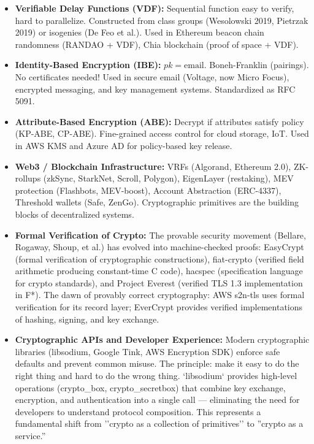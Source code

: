 \begin{itemize}
\item \textbf{Verifiable Delay Functions (VDF):} Sequential function easy to verify, hard to parallelize. Constructed from class groups (Wesolowski 2019, Pietrzak 2019) or isogenies (De Feo et al.). Used in Ethereum beacon chain randomness (RANDAO + VDF), Chia blockchain (proof of space + VDF).

\item \textbf{Identity-Based Encryption (IBE):} $pk = \text{email}$. Boneh-Franklin (pairings). No certificates needed! Used in secure email (Voltage, now Micro Focus), encrypted messaging, and key management systems. Standardized as RFC 5091.

\item \textbf{Attribute-Based Encryption (ABE):} Decrypt if attributes satisfy policy (KP-ABE, CP-ABE). Fine-grained access control for cloud storage, IoT. Used in AWS KMS and Azure AD for policy-based key release.

\item \textbf{Web3 / Blockchain Infrastructure:} VRFs (Algorand, Ethereum 2.0), ZK-rollups (zkSync, StarkNet, Scroll, Polygon), EigenLayer (restaking), MEV protection (Flashbots, MEV-boost), Account Abstraction (ERC-4337), Threshold wallets (Safe, ZenGo). Cryptographic primitives are the building blocks of decentralized systems.

\item \textbf{Formal Verification of Crypto:} The provable security movement (Bellare, Rogaway, Shoup, et al.) has evolved into machine-checked proofs: EasyCrypt (formal verification of cryptographic constructions), fiat-crypto (verified field arithmetic producing constant-time C code), hacspec (specification language for crypto standards), and Project Everest (verified TLS 1.3 implementation in F*). The dawn of provably correct cryptography: AWS s2n-tls uses formal verification for its record layer; EverCrypt provides verified implementations of hashing, signing, and key exchange.

\item \textbf{Cryptographic APIs and Developer Experience:} Modern cryptographic libraries (libsodium, Google Tink, AWS Encryption SDK) enforce safe defaults and prevent common misuse. The principle: make it easy to do the right thing and hard to do the wrong thing. `libsodium` provides high-level operations (crypto\_box, crypto\_secretbox) that combine key exchange, encryption, and authentication into a single call — eliminating the need for developers to understand protocol composition. This represents a fundamental shift from ''crypto as a collection of primitives'' to ''crypto as a service.''


\end{itemize}
